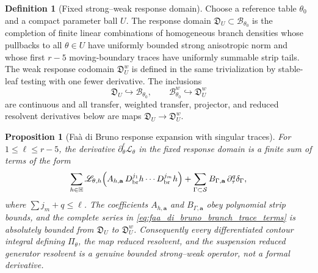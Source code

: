 \documentclass[12pt, letterpaper]{amsart}
\newcommand{\Bcal}{\mathcal{B}}
\providecommand{\Ssing}{\mathcal{S}}
\providecommand{\Hstrip}{\mathbb{H}}
\providecommand{\Ltransfer}{\mathscr{L}}
\theoremstyle{plain}
\newtheorem{proposition}[theorem]{Proposition}
\theoremstyle{definition}
\newtheorem{definition}[theorem]{Definition}
\theoremstyle{remark}
\begin{document}
\begin{definition}[Fixed strong--weak response domain]
\label{def:fixed_response_domain}
Choose a reference table \(\theta_0\) and a compact parameter ball \(U\).  The
response domain \(\mathfrak D_U\subset\Bcal_{\theta_0}\) is the completion of
finite linear combinations of homogeneous branch densities whose pullbacks to
all \(\theta\in U\) have uniformly bounded strong anisotropic norm and whose
first \(r-5\) moving-boundary traces have uniformly summable strip tails.  The
weak response codomain \(\mathfrak D_U^w\) is defined in the same trivialization
by stable-leaf testing with one fewer derivative.  The inclusions
\begin{equation}
    \mathfrak D_U\hookrightarrow \Bcal_{\theta_0},
    \qquad
    \Bcal_{\theta_0}^w\hookrightarrow\mathfrak D_U^w
\end{equation}
are continuous and all transfer, weighted transfer, projector, and reduced
resolvent derivatives below are maps \(\mathfrak D_U\to\mathfrak D_U^w\).
\end{definition}

\begin{proposition}[Fa\`a di Bruno response expansion with singular traces]
\label{prop:faa_di_bruno_singular_response}
For \(1\le \ell\le r-5\), the derivative
\(\partial_\theta^\ell \Ltransfer_\theta\) in the fixed response domain is a
finite sum of terms of the form
\begin{equation}
\label{eq:faa_di_bruno_branch_trace_terms}
    \sum_{h\in\Hstrip}
        \Ltransfer_{\theta,h}
        \Big(A_{h,\mathbf a}\,D_{\rm br}^{j_1}h\cdots D_{\rm br}^{j_m}h\Big)
    +
    \sum_{\Gamma\subset\Ssing}
        B_{\Gamma,\mathbf a}\,\partial_\tau^q\delta_\Gamma,
\end{equation}
where \(\sum j_m+q\le\ell\).  The coefficients \(A_{h,\mathbf a}\) and
\(B_{\Gamma,\mathbf a}\) obey polynomial strip bounds, and the complete series
in \eqref{eq:faa_di_bruno_branch_trace_terms} is absolutely bounded from
\(\mathfrak D_U\) to \(\mathfrak D_U^w\).  Consequently every differentiated
contour integral defining \(\Pi_\theta\), the map reduced resolvent, and the
suspension reduced generator resolvent is a genuine bounded strong--weak
operator, not a formal derivative.
\end{proposition}
\end{document}
